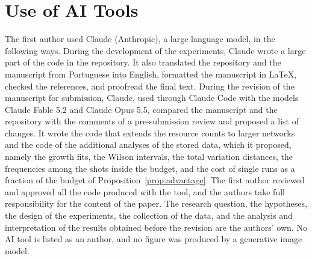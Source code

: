 \section*{Use of AI Tools}
The first author used Claude (Anthropic), a large language model, in the following ways. During the development of the experiments, Claude wrote a large part of the code in the repository. It also translated the repository and the manuscript from Portuguese into English, formatted the manuscript in \LaTeX, checked the references, and proofread the final text. During the revision of the manuscript for submission, Claude, used through Claude Code with the models Claude Fable 5.2 and Claude Opus 5.5, compared the manuscript and the repository with the comments of a pre-submission review and proposed a list of changes. It wrote the code that extends the resource counts to larger networks and the code of the additional analyses of the stored data, which it proposed, namely the growth fits, the Wilson intervals, the total variation distances, the frequencies among the shots inside the budget, and the cost of single runs as a fraction of the budget of Proposition~\ref{prop:advantage}. The first author reviewed and approved all the code produced with the tool, and the authors take full responsibility for the content of the paper. The research question, the hypotheses, the design of the experiments, the collection of the data, and the analysis and interpretation of the results obtained before the revision are the authors' own. No AI tool is listed as an author, and no figure was produced by a generative image model.
